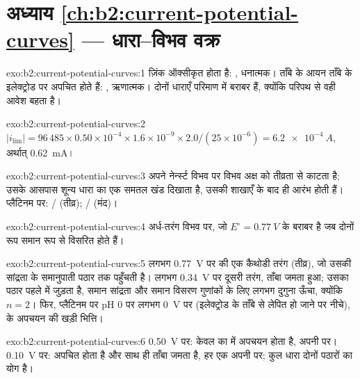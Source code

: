 \section*{अध्याय \ref{ch:b2:current-potential-curves} --- धारा--विभव वक्र}

\begin{solution}{exo:b2:current-potential-curves:1}
ज़िंक ऑक्सीकृत होता है: , धनात्मक। ताँबे के आयन ताँबे के इलेक्ट्रोड पर
अपचित होते हैं: , ऋणात्मक। दोनों धाराएँ परिमाण में
बराबर हैं, क्योंकि परिपथ से वही आवेश बहता है।
\end{solution}

\begin{solution}{exo:b2:current-potential-curves:2}
$|i_{\lim}| = 96\,485 \times 0.50 \times 10^{-4} \times 1.6 \times 10^{-9} \times
2.0/(25 \times 10^{-6}) = \qty{6.2e-4}{A}$, अर्थात् \qty{0.62}{mA}।
\end{solution}

\begin{solution}{exo:b2:current-potential-curves:3}
 अपने नेर्न्स्ट विभव पर विभव अक्ष को तीव्रता से काटता है;  उसके आसपास शून्य धारा का एक समतल खंड दिखाता है, उसकी शाखाएँ
 के बाद ही आरंभ होती हैं। प्लैटिनम पर: / (तीव्र);
/ (मंद)।
\end{solution}

\begin{solution}{exo:b2:current-potential-curves:4}
अर्ध-तरंग विभव पर, जो $E^\circ = \qty{0.77}{V}$ के बराबर है जब दोनों रूप
समान रूप से विसरित होते हैं।
\end{solution}

\begin{solution}{exo:b2:current-potential-curves:5}
लगभग \qty{0.77}{V} पर  की एक कैथोडी तरंग (तीव्र), जो उसकी सांद्रता के
समानुपाती पठार तक पहुँचती है। लगभग \qty{0.34}{V} पर दूसरी तरंग, ताँबा
जमता हुआ; उसका पठार पहले में जुड़ता है, समान
सांद्रता और समान विसरण गुणांकों के लिए लगभग दुगुना ऊँचा, क्योंकि $n = 2$। फिर,
प्लैटिनम पर pH 0 पर लगभग \qty{0}{V} पर (इलेक्ट्रोड के ताँबे से लेपित हो जाने पर नीचे),
 के अपचयन की खड़ी भित्ति।
\end{solution}

\begin{solution}{exo:b2:current-potential-curves:6}
\qty{0.50}{V} पर: केवल  का  में अपचयन होता है, अपनी  पर।
\qty{0.10}{V} पर:  अपचित होता है और साथ ही ताँबा जमता है,
हर एक अपनी  पर; कुल धारा दोनों पठारों का योग है।
\end{solution}

